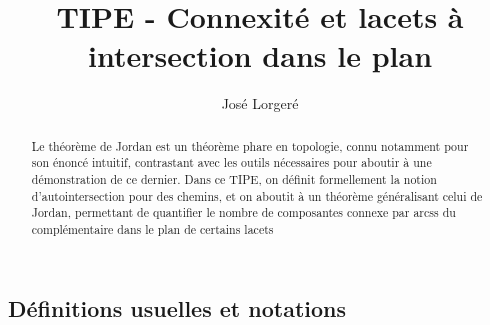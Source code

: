 \documentclass{article}
\begin{document}
\begin{flushleft}

\author{José Lorgeré}

\title{TIPE - Connexité et lacets à intersection dans le plan}

\maketitle

\begin{abstract}
    Le théorème de Jordan est un théorème phare en topologie, connu notamment pour son énoncé intuitif, contrastant avec les
    outils nécessaires pour aboutir à une démonstration de ce dernier. Dans ce TIPE, on définit formellement la notion d'autointersection
    pour des chemins, et on aboutit à un théorème généralisant celui de Jordan, permettant de quantifier le nombre de composantes
    connexe par arcss du complémentaire dans le plan de certains lacets
\end{abstract}

\section{Définitions usuelles et notations}


\end{flushleft}
\end{document}

